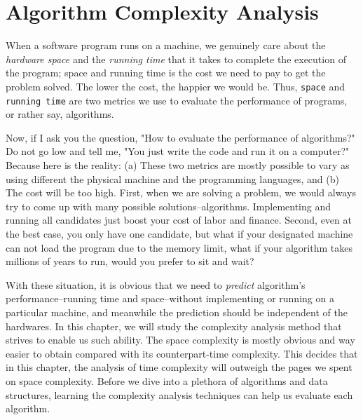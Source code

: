 \documentclass[../main.tex]{subfiles}
\begin{document}
\chapter{Algorithm Complexity Analysis}
\label{chapter_algorithm_analysis}
When a software program runs on a machine, we  genuinely care about the \textit{hardware space} and the \textit{running time} that it takes to complete the execution of the program; space and running time is the cost we need to pay to get the problem solved. The lower the cost, the happier we would be. Thus, \texttt{space} and \texttt{running time} are two metrics we use to evaluate the performance of programs, or rather say, algorithms. 

Now, if I ask you the question, "How to evaluate the performance of algorithms?" Do not go low and tell me, "You just write the code and run it on a computer?" Because here is the reality: (a) These two metrics are mostly possible to vary as using different the physical machine and the programming languages, and (b) The cost will be too high. First, when we are solving a problem, we would always try to come up with many possible solutions--algorithms. Implementing and running all candidates just boost your cost of labor and finance. Second, even at the best case, you only have one candidate, but what if your designated machine can not load the program due to the memory limit, what if your algorithm takes millions of years to run, would you prefer to sit and wait? 

With these situation, it is obvious that we need  to \textit{predict} algorithm's performance--running time and space--without implementing or running on a particular machine, and meanwhile the prediction should be independent of the hardwares. In this chapter, we will study the complexity analysis method that strives to enable us such ability.  The space complexity is mostly obvious and way easier to obtain compared with its counterpart-time complexity. This decides that in this chapter, the analysis of time complexity will outweigh the pages we spent on space complexity. Before we dive into a plethora of algorithms and data structures, learning the complexity analysis techniques can help us evaluate each algorithm. 


\end{document}
